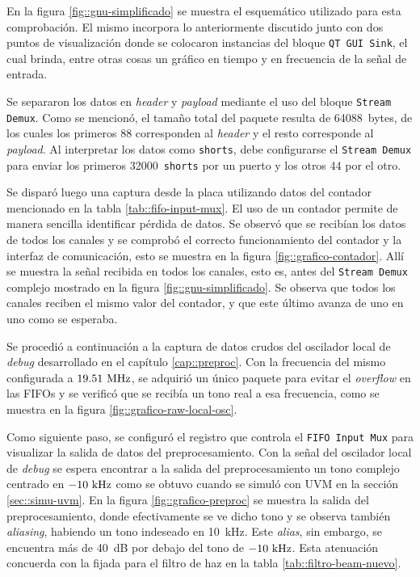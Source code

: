 \documentclass[../../main.tex]{subfiles}
\begin{document}
En la figura \ref{fig::gnu-simplificado} se muestra el esquemático utilizado para esta comprobación. El mismo incorpora lo anteriormente discutido junto con dos puntos de visualización donde se colocaron instancias del bloque \texttt{QT GUI Sink}, el cual brinda, entre otras cosas un gráfico en tiempo y en frecuencia de la señal de entrada.

Se separaron los datos en \textit{header} y \textit{payload} mediante el uso del bloque \texttt{Stream Demux}. Como se mencionó, el tamaño total del paquete resulta de 64088~bytes, de los cuales los primeros 88 corresponden al \textit{header} y el resto corresponde al \textit{payload}. Al interpretar los datos como \texttt{shorts}, debe configurarse el \texttt{Stream Demux} para enviar los primeros 32000~\texttt{shorts} por un puerto y los otros 44 por el otro.

Se disparó luego una captura desde la placa utilizando datos del contador mencionado en la tabla \ref{tab::fifo-input-mux}. El uso de un contador permite de manera sencilla identificar pérdida de datos. Se observó que se recibían los datos de todos los canales y se comprobó el correcto funcionamiento del contador y la interfaz de comunicación, esto se muestra en la figura \ref{fig::grafico-contador}. Allí se muestra la señal recibida en todos los canales, esto es, antes del \texttt{Stream Demux} complejo mostrado en la figura \ref{fig::gnu-simplificado}. Se observa que todos los canales reciben el mismo valor del contador, y que este último avanza de uno en uno como se esperaba.

Se procedió a continuación a la captura de datos crudos del oscilador local de \textit{debug} desarrollado en el capítulo \ref{cap::preproc}. Con la frecuencia del mismo configurada a $19.51~\textrm{MHz}$, se adquirió un único paquete para evitar el \textit{overflow} en las FIFOs y se verificó que se recibía un tono real a esa frecuencia, como se muestra en la figura \ref{fig::grafico-raw-local-osc}.

Como siguiente paso, se configuró el registro que controla el \texttt{FIFO Input Mux} para visualizar la salida de datos del preprocesamiento. Con la señal del oscilador local de \textit{debug} se espera encontrar a la salida del preprocesamiento un tono complejo centrado en $-10~\textrm{kHz}$ como se obtuvo cuando se simuló con UVM en la sección \ref{sec::simu-uvm}. En la figura \ref{fig::grafico-preproc} se muestra la salida del preprocesamiento, donde efectivamente se ve dicho tono y se observa también \textit{aliasing}, habiendo un tono indeseado en 10~kHz. Este \textit{alias}, sin embargo, se encuentra más de 40~dB por debajo del tono de $-10~\textrm{kHz}$. Esta atenuación concuerda con la fijada para el filtro de haz en la tabla \ref{tab::filtro-beam-nuevo}.
\end{document}
